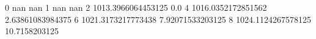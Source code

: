 0 nan nan
1 nan nan
2 1013.3966064453125 0.0
4 1016.0352172851562 2.63861083984375
6 1021.3173217773438 7.92071533203125
8 1024.1124267578125 10.7158203125
